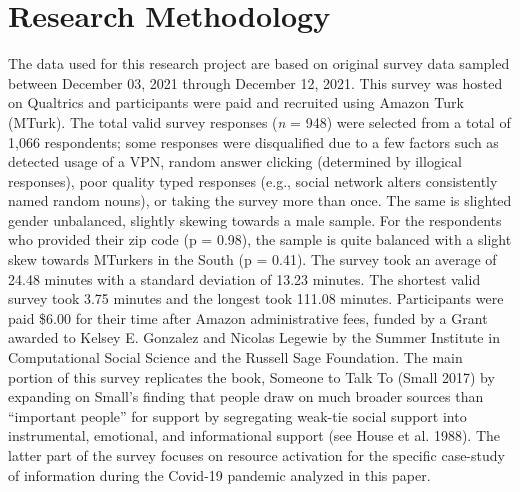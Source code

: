 \hypertarget{research-methodology}{%
\section{Research Methodology}\label{research-methodology}}

The data used for this research project are based on original survey data
sampled between December 03, 2021 through
December 12, 2021. This survey was hosted on Qualtrics and
participants were paid and recruited using Amazon Turk (MTurk). The total valid
survey responses (\emph{n} = 948) were selected from a total of 1,066
respondents; some responses were disqualified due to a few factors such as
detected usage of a VPN, random answer clicking (determined by illogical
responses), poor quality typed responses (e.g., social network alters
consistently named random nouns), or taking the survey more than once. The same
is slighted gender unbalanced, slightly skewing towards a male sample. For the
respondents who provided their zip code (p =
0.98), the
sample is quite balanced with a slight skew towards MTurkers in the South (p =
0.41).
The survey took an average of 24.48 minutes with a
standard deviation of 13.23 minutes. The shortest
valid survey took 3.75 minutes and the longest took
111.08 minutes. Participants were paid \$6.00 for their
time after Amazon administrative fees, funded by a Grant awarded to Kelsey E.
Gonzalez and Nicolas Legewie by the Summer Institute in Computational Social
Science and the Russell Sage Foundation. The main portion of this survey
replicates the book, Someone to Talk To (Small 2017) by expanding on
Small's finding that people draw on much broader sources than ``important people''
for support by segregating weak-tie social support into instrumental, emotional,
and informational support (see House et al. 1988). The latter
part of the survey focuses on resource activation for the specific case-study of
information during the Covid-19 pandemic analyzed in this paper.

